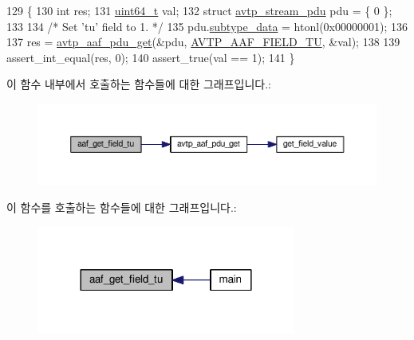 \begin{DoxyCode}
129 \{
130     \textcolor{keywordtype}{int} res;
131     \hyperlink{parse_8c_aec6fcb673ff035718c238c8c9d544c47}{uint64\_t} val;
132     \textcolor{keyword}{struct }\hyperlink{structavtp__stream__pdu}{avtp\_stream\_pdu} pdu = \{ 0 \};
133 
134     \textcolor{comment}{/* Set 'tu' field to 1. */}
135     pdu.\hyperlink{structavtp__stream__pdu_a3210e9f18fdc9c29cef7600c4d1e67e9}{subtype\_data} = htonl(0x00000001);
136 
137     res = \hyperlink{avtp__aaf_8h_acc4c927b036e22def8e6b6beb3ac6026}{avtp\_aaf\_pdu\_get}(&pdu, \hyperlink{avtp__aaf_8h_a7eaee6c1ebc806c0401dbe7b14cd22dbabc8e228f159d10a9134451448e470f36}{AVTP\_AAF\_FIELD\_TU}, &val);
138 
139     assert\_int\_equal(res, 0);
140     assert\_true(val == 1);
141 \}
\end{DoxyCode}


이 함수 내부에서 호출하는 함수들에 대한 그래프입니다.\+:
\nopagebreak
\begin{figure}[H]
\begin{center}
\leavevmode
\includegraphics[width=350pt]{test-aaf_8c_aa66b93a88e5f409a1b05a9b0eb838711_cgraph}
\end{center}
\end{figure}




이 함수를 호출하는 함수들에 대한 그래프입니다.\+:
\nopagebreak
\begin{figure}[H]
\begin{center}
\leavevmode
\includegraphics[width=240pt]{test-aaf_8c_aa66b93a88e5f409a1b05a9b0eb838711_icgraph}
\end{center}
\end{figure}


